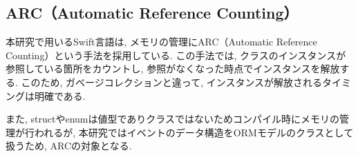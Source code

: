 \documentclass[../../../main]{subfiles}
\begin{document}
    \subsection{ARC（Automatic Reference Counting）}\label{subsec:phraseology-arc}
    本研究で用いるSwift言語は, メモリの管理にARC（Automatic Reference Counting）という手法を採用している. この手法では, クラスのインスタンスが参照している箇所をカウントし, 参照がなくなった時点でインスタンスを解放する. このため, ガベージコレクションと違って, インスタンスが解放されるタイミングは明確である.

    また, structやenumは値型でありクラスではないためコンパイル時にメモリの管理が行われるが, 本研究ではイベントのデータ構造をORMモデルのクラスとして扱うため, ARCの対象となる. \cite{ARC}
\end{document}
